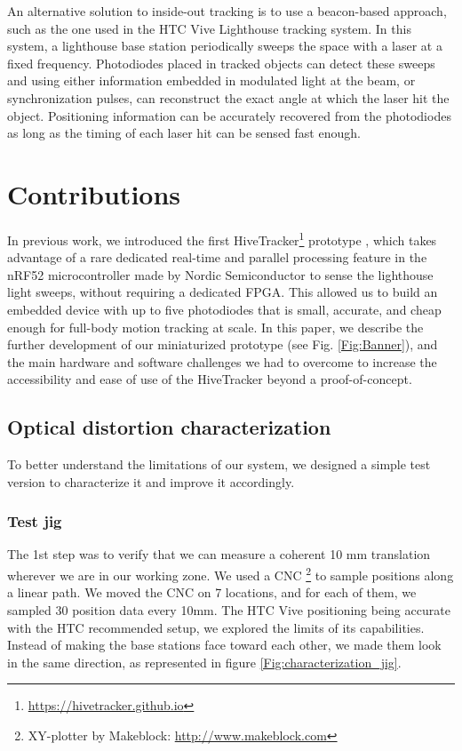 \documentclass[sigchi]{acmart}
\begin{document}
An alternative solution to inside-out tracking is to use a beacon-based approach, such as the one used in the HTC Vive Lighthouse tracking system. In this system, a lighthouse base station periodically sweeps the space with a laser at a fixed frequency. Photodiodes placed in tracked objects can detect these sweeps and using either information embedded in modulated light at the beam, or synchronization pulses, can reconstruct the exact angle at which the laser hit the object. Positioning information can be accurately recovered from the photodiodes as long as the timing of each laser hit can be sensed fast enough.


\section{Contributions}

In previous work, we introduced the first HiveTracker\footnote{\url{https://hivetracker.github.io}} prototype \cite{Quinones2018}, which takes advantage of a rare dedicated real-time and parallel processing feature in the nRF52 microcontroller made by Nordic Semiconductor to sense the lighthouse light sweeps, without requiring a dedicated FPGA. This allowed us to build an embedded device with up to five photodiodes that is small, accurate, and cheap enough for full-body motion tracking at scale.
\newline \newline
In this paper, we describe the further development of our miniaturized prototype (see Fig. \ref{Fig:Banner}), and the main hardware and software challenges we had to overcome to increase the accessibility and ease of use of the HiveTracker beyond a proof-of-concept.


\subsection{Optical distortion characterization}

To better understand the limitations of our system, we designed a simple test version to characterize it and improve it accordingly.

\subsubsection{Test jig}
The 1st step was to verify that we can measure a coherent 10 mm translation wherever we are in our working zone. We used a CNC \footnote{XY-plotter by Makeblock: \url{http://www.makeblock.com}} to sample positions along a linear path. We moved the CNC on 7 locations, and for each of them, we sampled 30 position data every 10mm. The HTC Vive positioning being accurate with the HTC recommended setup, we explored the limits of its capabilities. Instead of making the base stations face toward each other, we made them look in the same direction, as represented in figure \ref{Fig:characterization_jig}.
\end{document}
